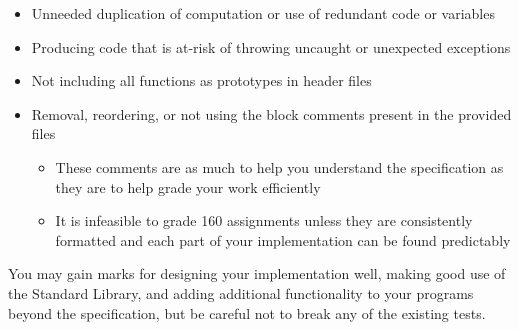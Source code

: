 \documentclass[a4paper]{article}
\begin{document}
\begin{itemize}
    \item Unneeded duplication of computation or use of redundant code or variables

    \item Producing code that is at-risk of throwing uncaught or unexpected exceptions

    \item Not including all functions as prototypes in header files

    \item Removal, reordering, or not using the block comments present in the provided files

        \begin{itemize}
            \item These comments are as much to help you understand the specification as they are to help grade your work efficiently
            \item It is infeasible to grade 160 assignments unless they are consistently formatted and each part of your implementation can be found predictably
    \end{itemize}

\end{itemize}

You may gain marks for designing your implementation well, making good use of the Standard Library, and adding additional functionality to your programs beyond the specification, but be careful not to break any of the existing tests.
\end{document}
